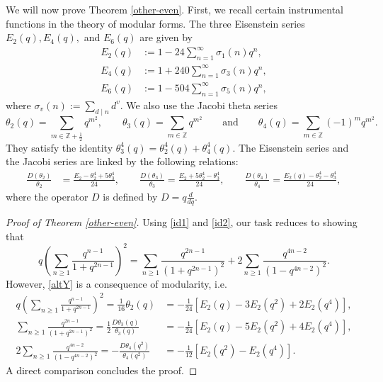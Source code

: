 \documentclass[a4paper,reqno,12pt]{amsart}
\begin{document}
We will now prove Theorem \ref{other-even}. First, we recall certain instrumental functions in the theory of modular forms. The three Eisenstein series $E_2(q), E_4(q),$ and $E_6(q)$ are given by
\begin{align*}
E_2(q)& :=1-24\sum_{n=1}^{\infty} \sigma_1(n)q^n,\\ 
E_4(q)& :=1+240\sum_{n=1}^{\infty}\sigma_3(n)q^n,\\  
E_6(q)& :=1-504\sum_{n=1}^{\infty} \sigma_5(n)q^n,
\end{align*}
 where $\sigma_v(n):=\sum_{d\mid n}d^v.$ We also use the Jacobi theta series
$$\theta_2(q)=\sum_{m\in\mathbb{Z}+\frac12}q^{m^2}, \qquad \theta_3(q)=\sum_{m\in\mathbb{Z}}q^{m^2} \qquad \text{and} \qquad
\theta_4(q)=\sum_{m\in\mathbb{Z}} (-1)^mq^{m^2}.$$
They satisfy the identity $\theta_3^4(q)=\theta_2^4(q)+\theta_4^4(q)$. The Eisenstein series and the Jacobi series are  linked by the following relations:
\begin{align*} 
\frac{D(\theta_2)}{\theta_2}&=\frac{E_2-\theta_2^4+5\theta_3^4}{24}, \qquad
\frac{D(\theta_3)}{\theta_3}=\frac{E_2+5\theta_2^4-\theta_3^4}{24}, \qquad
\frac{D(\theta_4)}{\theta_4}=\frac{E_2(q) - \theta_2^4-\theta_3^4}{24},
\end{align*} where the operator $D$ is defined by $D=q\frac{d}{dq}$. 




\begin{proof}[Proof of Theorem \ref{other-even}] Using \eqref{id1} and \eqref{id2}, our task reduces to showing that
\begin{equation}\label{altY} q\left(\sum_{n\geq1} \frac{q^{n-1}}{1+q^{2n-1}}\right)^2
=\sum_{n\geq1} \frac{q^{2n-1}}{(1+q^{2n-1})^2} + 2\sum_{n\geq1} \frac{q^{4n-2}}{(1-q^{4n-2})^2}.\end{equation}
However, \eqref{altY} is a consequence of modularity, i.e.
\begin{align*}
q\left(\sum_{n\geq1} \frac{q^{n-1}}{1+q^{2n-1}}\right)^2=\frac1{16} \theta_2(q)
&=-\frac1{24}[E_2(q)-3E_2(q^2)+2E_2(q^4)], \\
\sum_{n\geq1} \frac{q^{2n-1}}{(1+q^{2n-1})^2}  = \frac12\frac{D\theta_3(q)}{\theta_3(q)}
&=-\frac1{24}[E_2(q)-5E_2(q^2)+4E_2(q^4)], \\
2\sum_{n\geq1} \frac{q^{4n-2}}{(1-q^{4n-2})^2} = -\frac{D\theta_4(q^2)}{\theta_4(q^2)}
&=-\frac1{12}[E_2(q^2)-E_2(q^4)].  
\end{align*}
A direct comparison concludes the proof. 
\end{proof}
\end{document}

